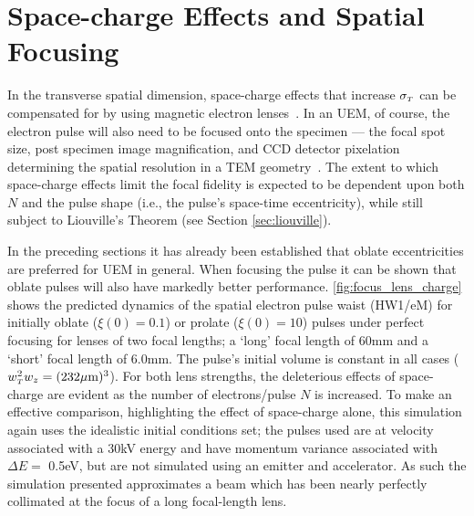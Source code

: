 
\section{Space-charge Effects and Spatial Focusing} \label{sec:mag_lens_charge}

In the transverse spatial dimension, space-charge effects that increase $ \sigma_{ {\scriptscriptstyle T} } $ can be compensated for by using magnetic electron lenses~\cite{oudheusden_electron_2007,lagrange_nanosecond_2008}.
In an UEM, of course, the electron pulse will also need to be focused onto the specimen --- the focal spot size, post specimen image magnification, and CCD detector pixelation determining the spatial resolution in a TEM geometry~\cite{berger_dc_2009}.
The extent to which space-charge effects limit the focal fidelity is expected to be dependent upon both $N$ and the pulse shape (i.e., the pulse's space-time eccentricity), while still subject to Liouville's Theorem (see Section \ref{sec:liouville}).



In the preceding sections it has already been established that oblate eccentricities are preferred for UEM in general.
When focusing the pulse it can be shown that oblate pulses will also have markedly better performance.
\ref{fig:focus_lens_charge} shows the predicted dynamics of the spatial electron pulse waist (HW1/eM) for initially oblate ($ \xi ( 0 ) = 0.1 $) or prolate ($ \xi ( 0 ) = 10 $) pulses under perfect focusing for lenses of two focal lengths; a `long' focal length of 60mm and a `short' focal length of 6.0mm.
The pulse's initial volume is constant in all cases ($w_{{\scriptscriptstyle T}}^2 w_{z} = (232 \mu\text{m})^3$).
For both lens strengths, the deleterious effects of space-charge are evident as the number of electrons/pulse $ N $ is increased.
To make an effective comparison, highlighting the effect of space-charge alone, this simulation again uses the idealistic initial conditions set; the pulses used are at velocity associated with a 30kV energy and have momentum variance associated with $\Delta E = $ 0.5eV, but are not simulated using an emitter and accelerator.
As such the simulation presented approximates a beam which has been nearly perfectly collimated at the focus of a long focal-length lens.

